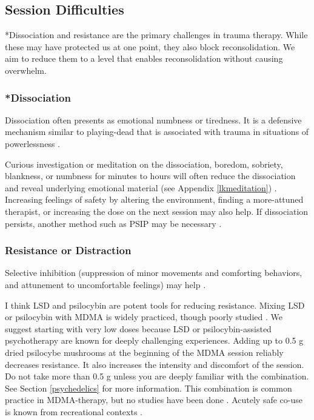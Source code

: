 \documentclass[12pt,letterpaper]{article}
\begin{document}
\subsection{Session Difficulties}
\label{sec:dissociationandresistance}
*Dissociation and resistance are the primary challenges in trauma therapy. While these may have protected us at one point, they also block reconsolidation. We aim to reduce them to a level that enables reconsolidation without causing overwhelm.

\subsubsection{*Dissociation}

Dissociation often presents as emotional numbness or tiredness. It is a defensive mechanism similar to playing-dead that is associated with trauma in situations of powerlessness \cite{loewensteinDissociation}.

Curious investigation or meditation on the dissociation, boredom, sobriety, blankness, or numbness for minutes to hours will often reduce the dissociation and reveal underlying emotional material (see Appendix \ref{lkmeditation}) \cite{razviPSIP}.  Increasing feelings of safety by altering the environment, finding a more-attuned therapist, or increasing the dose on the next session may also help. If dissociation persists, another method such as PSIP may be necessary \cite{razviPSIP}.
\subsubsection{Resistance or Distraction}
Selective inhibition (suppression of minor movements and comforting behaviors, and attunement to uncomfortable feelings) may help \cite{razviPSIP}.

 

I think LSD and psilocybin are potent tools for reducing resistance.  Mixing LSD or psilocybin with MDMA is widely practiced, though poorly studied \cite{zeifmanCo-use}. We suggest starting with very low doses because LSD or psilocybin-assisted psychotherapy are known for deeply challenging experiences. Adding up to 0.5 g dried psilocybe mushrooms at the beginning of the MDMA session reliably decreases resistance. It also increases the intensity and discomfort of the session. Do not take more than 0.5 g unless you are deeply familiar with the combination. See Section \ref{psychedelics} for more information. This combination is common practice in MDMA-therapy, but no studies have been done \cite{colemanPsychedelicPsychotherapy}. Acutely safe co-use is known from recreational contexts \cite{zeifmanCo-use}. 
\end{document}
